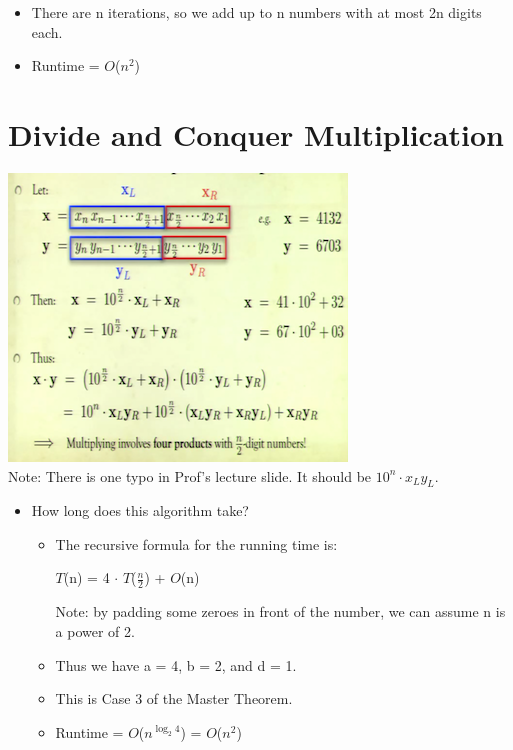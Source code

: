 \documentclass[12pt]{article}
\begin{document}
\begin{itemize}
\begin{itemize}
		\begin{itemize}
		\item There are n iterations, so we add up to n numbers with at most 2n digits each.
		\item Runtime = $O$($n^2$)
		\end{itemize}
	\end{itemize}
\end{itemize}

\section{Divide and Conquer Multiplication}
\renewcommand{\labelitemii}{$\circ$}
\renewcommand{\labelitemiii}{$\cdot$}
\renewcommand{\labelitemiii}{$\rightarrow$}
\includegraphics{lecture43}\\
Note: There is one typo in Prof's lecture slide. It should be $10^n \cdot x_L y_L$.
\begin{itemize}
\item How long does this algorithm take?
	\begin{itemize}
	\item The recursive formula for the running time is:
	
	\hspace*{\fill} {\large $T$(n) = 4 $\cdot$ $T$($\frac{n}{2}$) + $O$(n) } \hspace*{\fill} 
	
	Note: by padding some zeroes in front of the number, we can assume n is a power of 2.
	\item Thus we have a = 4, b = 2, and d = 1.
	\item This is Case 3 of the Master Theorem.
	\item Runtime = $O$($n^{\log_2 4}$) = $O$($n^2$)
	\end{itemize}
\end{itemize}
\end{document}
